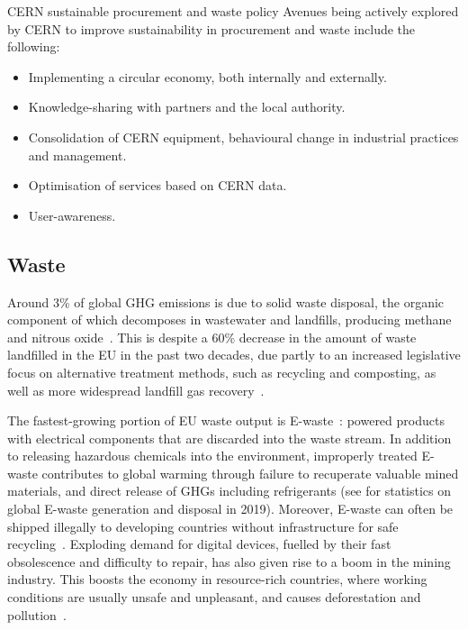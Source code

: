 \documentclass[../SustainableHEP.tex]{subfiles}
\begin{document}
\begin{bestpractice}{CERN sustainable procurement and waste policy}%
\noindent Avenues being actively explored by CERN to improve sustainability in procurement and waste include the following:
\begin{itemize}
    \item Implementing a circular economy, both internally and externally.      
\item Knowledge-sharing with partners and the local authority. 
\item Consolidation of CERN equipment, 
behavioural change in industrial practices and management. 
\item Optimisation of services based on CERN data. 
\item User-awareness.
\end{itemize}
\end{bestpractice}

\subsection{Waste}
\label{subsec:Waste}
Around 3\% of global GHG emissions is due to solid waste disposal, the organic component of which decomposes in wastewater and landfills, producing methane and nitrous oxide~\cite{owidco2andothergreenhousegasemissions}.  This is despite a 60\% decrease in the amount of waste landfilled in the EU in the past two decades, due partly to an increased legislative focus on alternative treatment methods, such as recycling and composting, as well as more widespread landfill gas recovery~\cite{Eurostat}.

The fastest-growing portion of EU waste output is E-waste~\cite{EUNews}: powered products with electrical components that are discarded into the waste stream. In addition to releasing hazardous
chemicals into the environment, improperly treated E-waste contributes to global warming through failure to recuperate valuable mined materials, and direct release of GHGs including refrigerants (see  for statistics on global E-waste generation and disposal in 2019). Moreover, E-waste can often be shipped illegally to developing countries without infrastructure for safe recycling~\cite{Forti2020, OECDLib}. Exploding demand for digital devices, fuelled by their fast obsolescence and difficulty to repair, has also given rise to a boom in the mining industry.  This boosts the economy in resource-rich countries, where working conditions are usually unsafe and unpleasant, and causes deforestation and pollution~\cite{OECDLib}.
\end{document}
